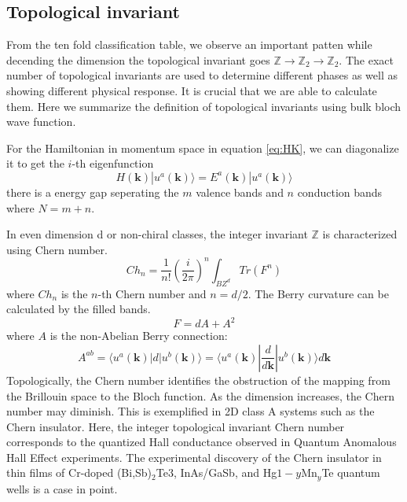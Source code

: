 \subsection{Topological invariant}
\label{sec:invariant}
From the ten fold classification table, we observe an important patten while decending the dimension the topological invariant goes $\mathbb{Z}\rightarrow\mathbb{Z}_2\rightarrow\mathbb{Z}_2$. The exact number of topological invariants are used to determine different phases as well as showing different physical response. It is crucial that we are able to calculate them. Here we summarize the definition of topological invariants using bulk bloch wave function\cite{chiu2016classification}. 

For the Hamiltonian in momentum space in equation \ref{eq:HK}, we can diagonalize it to get the $i$-th eigenfunction
\begin{equation}
    H(\mathbf{k})|u^a(\mathbf{k})\rangle = E^a(\mathbf{k})|u^a(\mathbf{k})\rangle
\end{equation}
there is a energy gap seperating the $m$ valence bands and $n$ conduction bands where $N=m+n$.

In even dimension d or non-chiral classes, the integer invariant $\mathbb{Z}$ is characterized using Chern number.
\begin{equation}
\label{eq:chern}
    Ch_n = \frac{1}{n!}(\frac{i}{2\pi})^n\int_{BZ^d}Tr(F^n)
\end{equation}
where $Ch_n$ is the $n$-th Chern number and $n=d/2$. The Berry curvature can be calculated by the filled bands.
\begin{equation}
    F = dA+A^2
\end{equation}
where $A$ is the non-Abelian Berry connection:
\begin{equation}
    A^{ab} = \langle u^a(\mathbf{k})|d|u^b(\mathbf{k})\rangle = \langle u^a(\mathbf{k})|\frac{d}{d\mathbf{k}}|u^b(\mathbf{k})\rangle d\mathbf{k}
\end{equation}
Topologically, the Chern number identifies the obstruction of the mapping from the Brillouin space to the Bloch function. As the dimension increases, the Chern number may diminish. This is exemplified in 2D class A systems such as the Chern insulator\cite{haldane1988model}. Here, the integer topological invariant Chern number corresponds to the quantized Hall conductance observed in Quantum Anomalous Hall Effect experiments. The experimental discovery of the Chern insulator in thin films of Cr-doped (Bi,Sb)$_2$Te$3$, InAs/GaSb, and Hg${1-y}$Mn$_y$Te quantum wells\cite{chang2013experimental, wang2014quantum,liu2008quantum} is a case in point.


